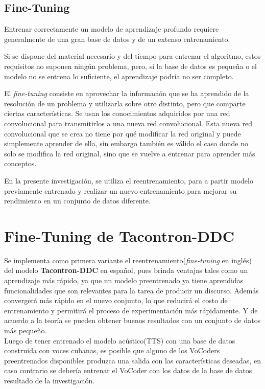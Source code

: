 \subsection*{Fine-Tuning}
Entrenar correctamente un modelo de aprendizaje profundo requiere generalmente de una gran base de datos y de un extenso entrenamiento.

Si se dispone del material necesario y del tiempo para entrenar el algoritmo, estos requisitos no suponen ningún problema, pero, si la base de datos es pequeña o el modelo no se entrena lo suficiente, el aprendizaje podría no ser completo.

El \textit{fine-tuning} consiste en aprovechar la información que se ha aprendido de la resolución de un problema y utilizarla sobre otro distinto, pero que comparte ciertas características. Se usan los conocimientos adquiridos por una red convolucional para transmitirlos a una nueva red convolucional. Esta nueva red convolucional que se crea no tiene por qué modificar la red original y puede simplemente aprender de ella, sin embargo también es válido el caso donde no solo se modifica la red original, sino que se vuelve a entrenar para aprender más conceptos.

En la presente investigación, se utiliza el reentrenamiento, para a partir modelo previamente entrenado y realizar un nuevo entrenamiento para mejorar su rendimiento en un conjunto de datos diferente.\\

\section{Fine-Tuning de Tacontron-DDC} \label{taco}

Se implementa como primera variante el reentrenamiento(\textit{fine-tuning} en inglés) del modelo \textbf{Tacontron-DDC} en español, pues brinda ventajas tales como un aprendizaje más rápido, ya que un modelo preentrenado ya tiene aprendidas funcionalidades que son relevantes para la tarea de producir un discurso. Además convergerá más rápido en el nuevo conjunto, lo que reducirá el costo de entrenamiento y permitirá el proceso de experimentación más rápidamente. Y de acuerdo a la teoría se pueden obtener buenos resultados con un conjunto de datos más pequeño.\\

Luego de tener entrenado el modelo acústico(TTS) con una base de datos construida con voces cubanas, es posible que alguno de los VoCoders preentrenados disponibles produzca una salida con las características deseadas, en caso contrario se debería entrenar el VoCoder con los datos de la base de datos resultado de la investigación.


